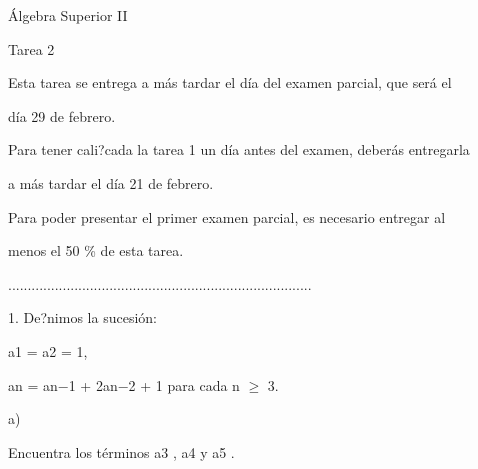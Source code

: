 \documentclass[a4paper,portrait,12pt]{article}
\begin{document}
\begin{flushleft}
\'{A}lgebra Superior II
\end{flushleft}


\begin{flushleft}
Tarea 2
\end{flushleft}


\begin{flushleft}
Esta tarea se entrega a m\'{a}s tardar el d\'{i}a del examen parcial, que ser\'{a} el
\end{flushleft}


\begin{flushleft}
d\'{i}a 29 de febrero.
\end{flushleft}


\begin{flushleft}
Para tener cali?cada la tarea 1 un d\'{i}a antes del examen, deber\'{a}s entregarla
\end{flushleft}


\begin{flushleft}
a m\'{a}s tardar el d\'{i}a 21 de febrero.
\end{flushleft}


\begin{flushleft}
Para poder presentar el primer examen parcial, es necesario entregar al
\end{flushleft}


\begin{flushleft}
menos el 50 \% de esta tarea.
\end{flushleft}


..............................................................................


\begin{flushleft}
1. De?nimos la sucesi\'{o}n:
\end{flushleft}


\begin{flushleft}
a1 = a2 = 1,
\end{flushleft}


\begin{flushleft}
an = an$-$1 + 2an$-$2 + 1 para cada n $\geq$ 3.
\end{flushleft}


\begin{flushleft}
a)
\end{flushleft}





\begin{flushleft}
Encuentra los t\'{e}rminos a3 , a4 y a5 .
\end{flushleft}
\end{document}

